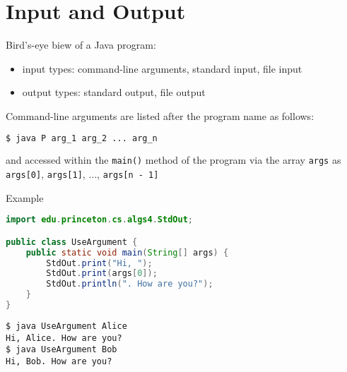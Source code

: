 \documentclass[8pt,a4paper,compress]{beamer}
\begin{document}
\section{Input and Output}
\begin{frame}[fragile]
Bird's-eye biew of a Java program:
\begin{center}
\end{center}

\begin{itemize}
\item input types: command-line arguments, standard input, file input
\item output types: standard output, file output
\end{itemize}

\bigskip

Command-line arguments are listed after the program name as follows:

\begin{lstlisting}[language=bash]
$ java P arg_1 arg_2 ... arg_n
\end{lstlisting}
and accessed within the \lstinline$main()$ method of the program via the array \lstinline$args$  as \lstinline$args[0]$, \lstinline$args[1]$, $\dots$, \lstinline$args[n - 1]$

\bigskip

Example

\begin{lstlisting}[language=Java]
import edu.princeton.cs.algs4.StdOut;

public class UseArgument {
    public static void main(String[] args) {
        StdOut.print("Hi, ");
        StdOut.print(args[0]);
        StdOut.println(". How are you?");
    }
}
\end{lstlisting}

\begin{lstlisting}[language={}]
$ java UseArgument Alice
Hi, Alice. How are you?
$ java UseArgument Bob
Hi, Bob. How are you?
\end{lstlisting}
\end{frame}
\end{document}
